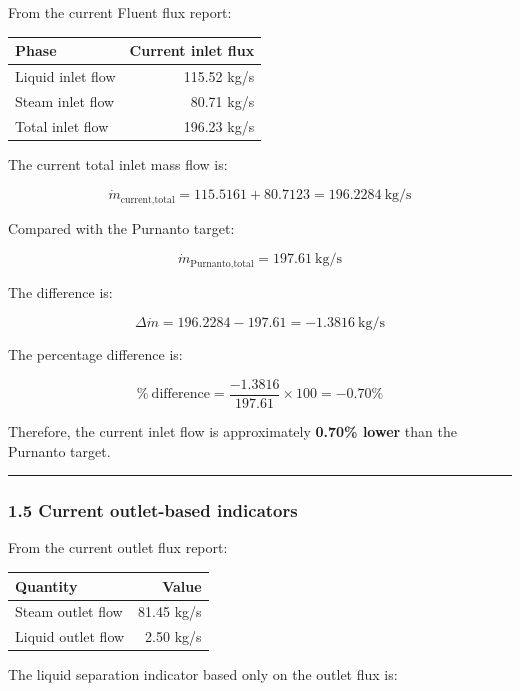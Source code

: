 \documentclass[
  11pt,
]{article}
\newcounter{none} %
\begin{document}
From the current Fluent flux report:

{\def\LTcaptype{none} %
\begin{longtable}[]{@{}lr@{}}
\toprule\noalign{}
Phase & Current inlet flux \\
\midrule\noalign{}
\endhead
\bottomrule\noalign{}
\endlastfoot
Liquid inlet flow & 115.52 kg/s \\
Steam inlet flow & 80.71 kg/s \\
Total inlet flow & 196.23 kg/s \\
\end{longtable}
}

The current total inlet mass flow is:

\[
\dot{m}_{\text{current,total}}
=
115.5161 + 80.7123
=
196.2284\ \text{kg/s}
\]

Compared with the Purnanto target:

\[
\dot{m}_{\text{Purnanto,total}}
=
197.61\ \text{kg/s}
\]

The difference is:

\[
\Delta \dot{m}
=
196.2284 - 197.61
=
-1.3816\ \text{kg/s}
\]

The percentage difference is:

\[
\%\ \text{difference}
=
\frac{-1.3816}{197.61}
\times 100
=
-0.70\%
\]

Therefore, the current inlet flow is approximately \textbf{0.70\% lower}
than the Purnanto target.

\begin{center}\rule{0.5\linewidth}{0.5pt}\end{center}

\subsubsection{1.5 Current outlet-based
indicators}\label{current-outlet-based-indicators}

From the current outlet flux report:

{\def\LTcaptype{none} %
\begin{longtable}[]{@{}lr@{}}
\toprule\noalign{}
Quantity & Value \\
\midrule\noalign{}
\endhead
\bottomrule\noalign{}
\endlastfoot
Steam outlet flow & 81.45 kg/s \\
Liquid outlet flow & 2.50 kg/s \\
\end{longtable}
}

The liquid separation indicator based only on the outlet flux is:
\end{document}
